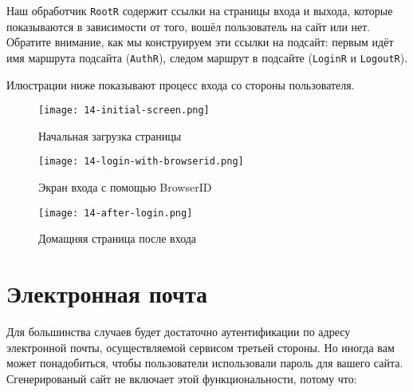 Наш обработчик \lstinline'RootR' содержит ссылки на страницы входа и выхода, которые показываются в зависимости от того, вошёл пользователь на сайт или нет. Обратите внимание, как мы конструируем эти ссылки на подсайт: первым идёт имя маршрута подсайта (\lstinline'AuthR'), следом маршрут в подсайте (\lstinline'LoginR' и \lstinline'LogoutR').

Илюстрации ниже показывают процесс входа со стороны пользователя.

\begin{figure}[h!]
  \centering
  \texttt{[image: 14-initial-screen.png]}
  \caption{Начальная загрузка страницы}
\end{figure}

\begin{figure}[h!]
  \centering
  \texttt{[image: 14-login-with-browserid.png]}
  \caption{Экран входа с помощью BrowserID}
\end{figure}

\begin{figure}[h!]
  \centering
  \texttt{[image: 14-after-login.png]}
  \caption{Домащняя страница после входа}
\end{figure}

\section{Электронная почта}

Для большинства случаев будет достаточно аутентификации по адресу электронной почты, осуществляемой сервисом третьей стороны. Но иногда вам может понадобиться, чтобы пользователи использовали пароль для вашего сайта. Сгенерированый сайт не включает этой функциональности, потому что:

